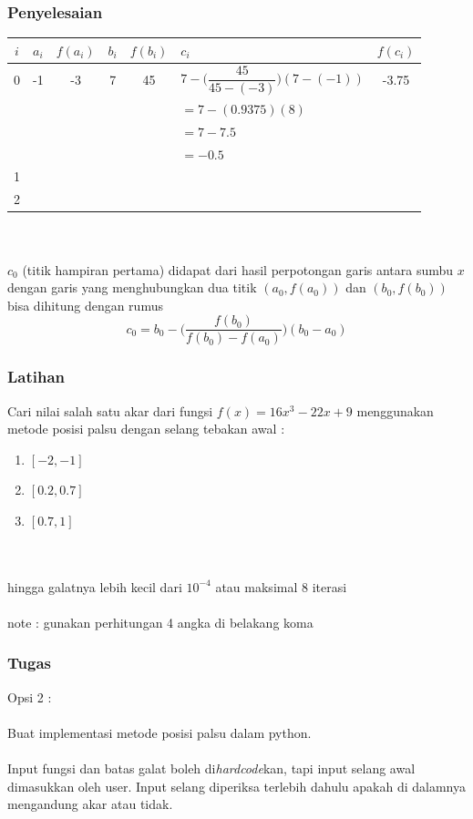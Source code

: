 \documentclass{beamer}
\begin{document}
\begin{frame}
\frametitle{Penyelesaian}
\begin{tabular}{|c|c|c|c|c|l|c|}
\hline
	$i$ & $a_i$ & $f(a_i)$ & $b_i$ & $f(b_i)$ & $c_i$ & $f(c_i)$\\
\hline
	0 & -1 & -3 & 7 & 45 & $7 - \biggl(\dfrac{45}{45-(-3)}\biggr)(7-(-1))$ & -3.75\\
	  &  &  &  &  & $=7 - (0.9375)(8)$  & \\
	  &  &  &  &  & $=7 - 7.5$  & \\
	  &  &  &  &  & $=-0.5$  & \\
\hline
	1 &  &  &  &  &  & \\
\hline
	2 &  &  &  &  &  & \\
\hline
\end{tabular}
\\\ \\$c_0$ (titik hampiran pertama) didapat dari hasil perpotongan garis antara sumbu $x$ dengan garis yang menghubungkan dua titik $(a_0,f(a_0))$ dan $(b_0,f(b_0))$
\\bisa dihitung dengan rumus 
\begin{equation}
c_0 = b_0 - \biggl(\dfrac{f(b_0)}{f(b_0)-f(a_0)}\biggr)(b_0-a_0)\nonumber
\end{equation}
\end{frame}


\begin{frame}
\frametitle{Latihan}
Cari nilai salah satu akar dari fungsi $f(x) = 16x^3 -22x +9$ menggunakan metode posisi palsu dengan selang tebakan awal :
\begin{enumerate}
\item $[-2,-1]$
\item $[0.2,0.7]$
\item $[0.7,1]$
\end{enumerate}
\ \\\ \\
hingga galatnya lebih kecil dari $10^{-4}$ atau maksimal 8 iterasi 
\\\ \\note : gunakan perhitungan 4 angka di belakang koma
\end{frame}


\begin{frame}
\frametitle{Tugas}
Opsi 2 :\\\ \\
Buat implementasi metode posisi palsu dalam python. \\\ \\Input fungsi dan batas galat boleh di\textit{hardcode}kan, tapi input selang awal dimasukkan oleh user. Input selang diperiksa terlebih dahulu apakah di dalamnya mengandung akar atau tidak.
\end{frame}
\end{document}
